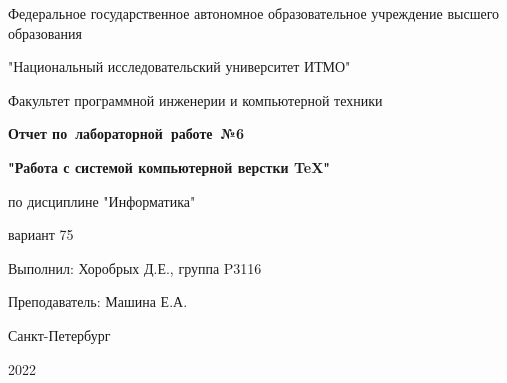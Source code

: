 
% 
\begin{center}
Федеральное государственное автономное образовательное учреждение высшего образования

"Национальный исследовательский университет ИТМО"

Факультет программной инженерии и компьютерной техники
\end{center}
\vspace{5cm}

\begin{center}
{\LARGE\textbf{Отчет 
по~лабораторной~работе~№6}}

{\LARGE\textbf{"Работа с системой компьютерной верстки \TeX"}}

по дисциплине "Информатика"

вариант 75
\end{center}
\vspace{5cm}

\begin{flushright}
Выполнил: Хоробрых Д.Е., группа P3116

Преподаватель: Машина Е.А.
\end{flushright} 
\vspace{5cm}

\begin{center}
Санкт-Петербург

2022
\end{center}

% 
